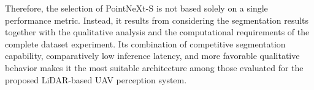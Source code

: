 Therefore, the selection of PointNeXt-S is not based solely on a single performance metric. Instead, it results from considering the segmentation results together with the qualitative analysis and the computational requirements of the complete dataset experiment. Its combination of competitive segmentation capability, comparatively low inference latency, and more favorable qualitative behavior makes it the most suitable architecture among those evaluated for the proposed LiDAR-based UAV perception system.
